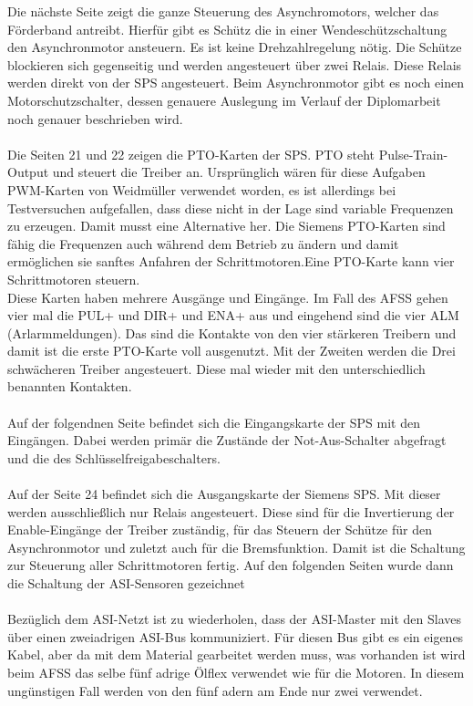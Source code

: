     Die nächste Seite zeigt die ganze Steuerung des Asynchromotors, welcher das Förderband antreibt. Hierfür gibt es Schütz die in einer Wendeschützschaltung den Asynchronmotor ansteuern. Es ist keine Drehzahlregelung nötig. Die Schütze blockieren sich gegenseitig und werden angesteuert über zwei Relais. Diese Relais werden direkt von der SPS angesteuert. Beim Asynchronmotor gibt es noch einen Motorschutzschalter, dessen genauere Auslegung im Verlauf der Diplomarbeit noch genauer beschrieben wird.\\\\
    Die Seiten 21 und 22 zeigen die PTO-Karten der SPS. PTO steht Pulse-Train-Output und steuert die Treiber an. Ursprünglich wären für diese Aufgaben PWM-Karten von Weidmüller verwendet worden, es ist allerdings bei Testversuchen aufgefallen, dass diese nicht in der Lage sind variable Frequenzen zu erzeugen. Damit musst eine Alternative her. Die Siemens PTO-Karten sind fähig die Frequenzen auch während dem Betrieb zu ändern und damit ermöglichen sie sanftes Anfahren der Schrittmotoren.Eine PTO-Karte kann vier Schrittmotoren steuern.\\
    Diese Karten haben mehrere Ausgänge und Eingänge. Im Fall des AFSS gehen vier mal die PUL+ und DIR+ und ENA+ aus und eingehend sind die vier ALM (Arlarmmeldungen). Das sind die Kontakte von den vier stärkeren Treibern und damit ist die erste PTO-Karte voll ausgenutzt. Mit der Zweiten werden die Drei schwächeren Treiber angesteuert. Diese mal wieder mit den unterschiedlich benannten Kontakten.\\\\
    Auf der folgendnen Seite befindet sich die Eingangskarte der SPS mit den Eingängen. Dabei werden primär die Zustände der Not-Aus-Schalter abgefragt und die des Schlüsselfreigabeschalters.\\\\
    Auf der Seite 24 befindet sich die Ausgangskarte der Siemens SPS. Mit dieser werden ausschließlich nur Relais angesteuert. Diese sind für die Invertierung der Enable-Eingänge der Treiber zuständig, für das Steuern der Schütze für den Asynchronmotor und zuletzt auch für die Bremsfunktion. Damit ist die Schaltung zur Steuerung aller Schrittmotoren fertig. Auf den folgenden Seiten wurde dann die Schaltung der ASI-Sensoren gezeichnet\\\\ 
    Bezüglich dem ASI-Netzt ist zu wiederholen, dass der ASI-Master mit den Slaves über einen zweiadrigen ASI-Bus kommuniziert. Für diesen Bus gibt es ein eigenes Kabel, aber da mit dem Material gearbeitet werden muss, was vorhanden ist wird beim AFSS das selbe fünf adrige Ölflex verwendet wie für die Motoren. In diesem ungünstigen Fall werden von den fünf adern am Ende nur zwei verwendet.\\

